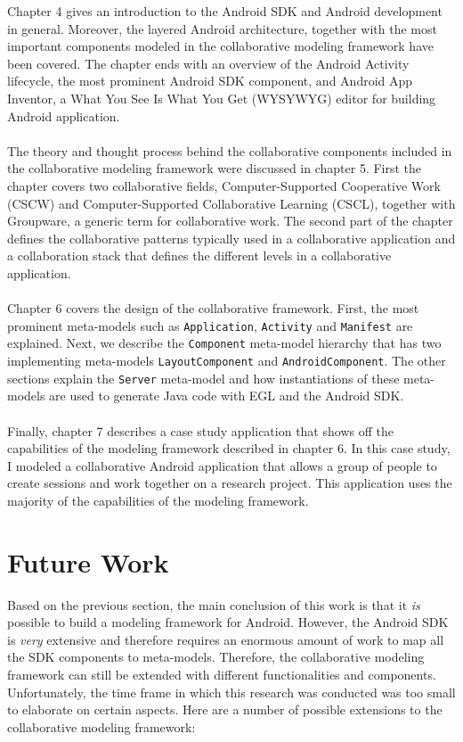 Chapter 4 gives an introduction to the Android SDK and Android development in general. Moreover, the layered Android architecture, together with the most important components modeled in the collaborative modeling framework have been covered. The chapter ends with an overview of the Android Activity lifecycle, the most prominent Android SDK component, and Android App Inventor, a What You See Is What You Get (WYSYWYG) editor for building Android application. \\ \\
The theory and thought process behind the collaborative components included in the collaborative modeling framework were discussed in chapter 5. First the chapter covers two collaborative fields, Computer-Supported Cooperative Work (CSCW) and Computer-Supported Collaborative Learning (CSCL), together with Groupware, a generic term for collaborative work. The second part of the chapter defines the collaborative patterns typically used in a collaborative application and a collaboration stack that defines the different levels in a collaborative application.  \\ \\
Chapter 6 covers the design of the collaborative framework. First, the most prominent meta-models such as \texttt{Application}, \texttt{Activity} and \texttt{Manifest} are explained. Next, we describe the \texttt{Component} meta-model hierarchy that has two implementing meta-models \texttt{LayoutComponent} and \texttt{AndroidComponent}. The other sections explain the \texttt{Server} meta-model and how instantiations of these meta-models are used to generate Java code with EGL and the Android SDK. \\ \\
Finally, chapter 7 describes a case study application that shows off the capabilities of the modeling framework described in chapter 6. In this case study, I modeled a collaborative Android application that allows a group of people to create sessions and work together on a research project. This application uses the majority of the capabilities of the modeling framework.

\section{Future Work}

Based on the previous section, the main conclusion of this work is that it \textit{is} possible to build a modeling framework for Android. However, the Android SDK is \textit{very} extensive and therefore requires an enormous amount of work to map all the SDK components to meta-models. Therefore, the collaborative modeling framework can still be extended with different functionalities and components. Unfortunately, the time frame in which this research was conducted was too small to elaborate on certain aspects. Here are a number of possible extensions to the collaborative modeling framework:

